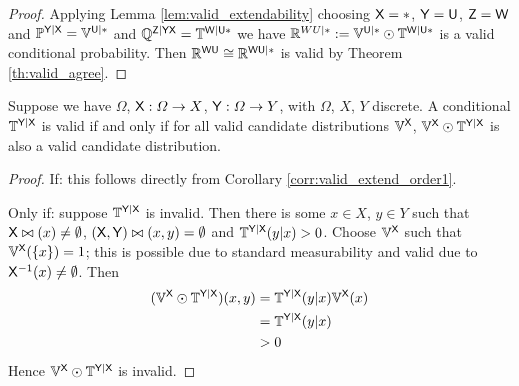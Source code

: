 \begin{proof}
Applying Lemma \ref{lem:valid_extendability} choosing $\mathsf{X}=*$, $\mathsf{Y}=\mathsf{U}$, $\mathsf{Z}=\mathsf{W}$ and $\mathbb{P}^{\mathsf{Y}|\mathsf{X}}=\mathbb{V}^{\mathsf{U}|*}$ and $\mathbb{Q}^{\mathsf{Z}|\mathsf{YX}}=\mathbb{T}^{\mathsf{W}|\mathsf{U*}}$ we have $\mathbb{R}^{WU|*}:=\mathbb{V}^{\mathsf{U}|*}\odot \mathbb{T}^{\mathsf{W}|\mathsf{U}*}$ is a valid conditional probability. Then $\mathbb{R}^{\mathsf{WU}}\cong \mathbb{R}^{\mathsf{WU}|*}$ is valid by Theorem \ref{th:valid_agree}.
\end{proof}

\begin{theorem}\label{th:valid_conditional_probability}
Suppose we have $\Omega$, $\mathsf{X}:\Omega\to X$, $\mathsf{Y}:\Omega\to Y$, with $\Omega$, $X$, $Y$ discrete. A conditional $\mathbb{T}^{\mathsf{Y}|\mathsf{X}}$ is valid if and only if for all valid candidate distributions $\mathbb{V}^{\mathsf{X}}$, $\mathbb{V}^{\mathsf{X}}\odot \mathbb{T}^{\mathsf{Y}|\mathsf{X}}$ is also a valid candidate distribution.
\end{theorem}

\begin{proof}
If: this follows directly from Corollary \ref{corr:valid_extend_order1}.

Only if: suppose $\mathbb{T}^{\mathsf{Y}|\mathsf{X}}$ is invalid. Then there is some $x\in X$, $y\in Y$ such that $\mathsf{X}\bowtie(x)\neq \emptyset$, $(\mathsf{X},\mathsf{Y})\bowtie(x,y)=\emptyset$ and $\mathbb{T}^{\mathsf{Y}|\mathsf{X}}(y|x)>0$. Choose $\mathbb{V}^{\mathsf{X}}$ such that $\mathbb{V}^{\mathsf{X}}(\{x\})=1$; this is possible due to standard measurability and valid due to $\mathsf{X}^{-1}(x)\neq \emptyset$. Then
\begin{align}
    (\mathbb{V}^{\mathsf{X}}\odot \mathbb{T}^{\mathsf{Y}|\mathsf{X}})(x,y) &= \mathbb{T}^{\mathsf{Y}|\mathsf{X}}(y|x) \mathbb{V}^{\mathsf{X}}(x)\\
                                                                     &= \mathbb{T}^{\mathsf{Y}|\mathsf{X}}(y|x)\\
                                                                     &>0
\end{align}
Hence $\mathbb{V}^{\mathsf{X}}\odot \mathbb{T}^{\mathsf{Y}|\mathsf{X}}$ is invalid.
\end{proof}


